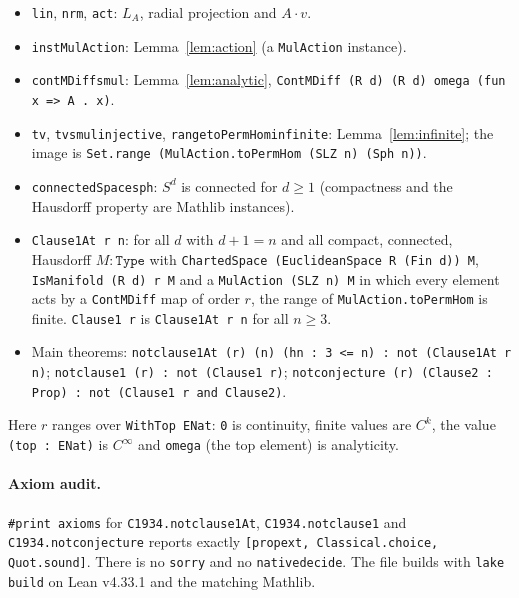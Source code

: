 \documentclass[11pt]{article}
\theoremstyle{definition}
\theoremstyle{remark}
\renewcommand{\_}{\oldus\allowbreak}
\begin{document}
\begin{itemize}[itemsep=1pt]
  \item \texttt{lin}, \texttt{nrm}, \texttt{act}: $L_A$, radial projection and $A\cdot v$.
  \item \texttt{instMulAction}: Lemma~\ref{lem:action} (a \texttt{MulAction} instance).
  \item \texttt{contMDiff\_smul}: Lemma~\ref{lem:analytic},
        \texttt{ContMDiff (R d) (R d) omega (fun x => A . x)}.
  \item \texttt{tv}, \texttt{tv\_smul\_injective}, \texttt{range\_toPermHom\_infinite}: Lemma~\ref{lem:infinite};
        the image is \texttt{Set.range (MulAction.toPermHom (SLZ n) (Sph n))}.
  \item \texttt{connectedSpace\_sph}: $S^d$ is connected for $d\ge 1$ (compactness and the Hausdorff
        property are Mathlib instances).
  \item \texttt{Clause1At r n}: for all $d$ with $d+1=n$ and all compact, connected, Hausdorff
        $M:\texttt{Type}$ with \texttt{ChartedSpace (EuclideanSpace R (Fin d)) M},
        \texttt{IsManifold (R d) r M} and a \texttt{MulAction (SLZ n) M} in which every element acts by
        a \texttt{ContMDiff} map of order $r$, the range of \texttt{MulAction.toPermHom} is finite.
        \texttt{Clause1 r} is \texttt{Clause1At r n} for all $n\ge 3$.
  \item Main theorems: \texttt{not\_clause1At (r) (n) (hn : 3 <= n) : not (Clause1At r n)};
        \texttt{not\_clause1 (r) : not (Clause1 r)};
        \texttt{not\_conjecture (r) (Clause2 : Prop) : not (Clause1 r and Clause2)}.
\end{itemize}
Here $r$ ranges over \texttt{WithTop ENat}: \texttt{0} is continuity, finite values are $C^k$, the
value \texttt{(top : ENat)} is $C^\infty$ and \texttt{omega} (the top element) is analyticity.

\paragraph{Axiom audit.} \texttt{\#print axioms} for \texttt{C1934.not\_clause1At},
\texttt{C1934.not\_clause1} and \texttt{C1934.not\_conjecture} reports exactly
\texttt{[propext, Classical.choice, Quot.sound]}. There is no \texttt{sorry} and no
\texttt{native\_decide}. The file builds with \texttt{lake build} on Lean v4.33.1 and the matching
Mathlib.
\end{document}

